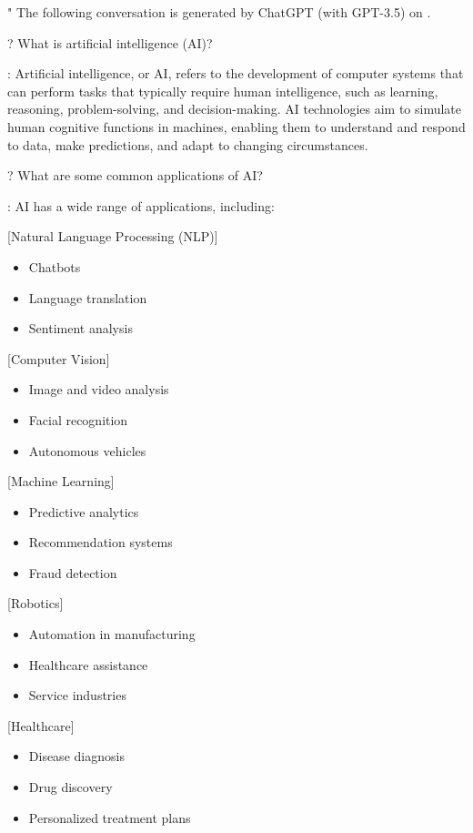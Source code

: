 "
  The following conversation is generated by ChatGPT (with GPT-3.5) on .

?
  What is artificial intelligence (AI)?

:
  Artificial intelligence, or AI, refers to the development of computer systems that can perform tasks that typically require human intelligence, such as learning, reasoning, problem-solving, and decision-making. AI technologies aim to simulate human cognitive functions in machines, enabling them to understand and respond to data, make predictions, and adapt to changing circumstances.

?
  What are some common applications of AI?

:
  AI has a wide range of applications, including:

  [Natural Language Processing (NLP)]
  \begin{itemize}
    \item Chatbots
    \item Language translation
    \item Sentiment analysis
  \end{itemize}

  [Computer Vision]
  \begin{itemize}
    \item Image and video analysis
    \item Facial recognition
    \item Autonomous vehicles
  \end{itemize}

  [Machine Learning]
  \begin{itemize}
    \item Predictive analytics
    \item Recommendation systems
    \item Fraud detection
  \end{itemize}

  [Robotics]
  \begin{itemize}
    \item Automation in manufacturing
    \item Healthcare assistance
    \item Service industries
  \end{itemize}

  [Healthcare]
  \begin{itemize}
    \item Disease diagnosis
    \item Drug discovery
    \item Personalized treatment plans
  \end{itemize}

